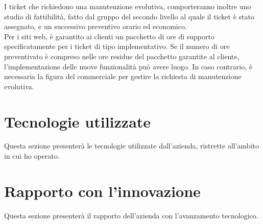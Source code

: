 		I ticket che richiedono una manutenzione evolutiva, comporteranno inoltre uno studio di fattibilità, fatto dal gruppo del secondo livello al quale il ticket è stato assegnato, e un successivo preventivo orario ed economico. \\
		Per i siti web, è garantito ai clienti un pacchetto di ore di supporto specificatamente per i ticket di tipo implementativo. Se il numero di ore preventivato è compreso nelle ore residue del pacchetto garantite al cliente, l'implementazione delle nuove funzionalità può avere luogo. In caso contrario, è necessaria la figura del commerciale per gestire la richiesta di manutenzione evolutiva.

\section{Tecnologie utilizzate}
\label{sec:tecnologie_utilizzate}
Questa sezione presenterà le tecnologie utilizzate dall'azienda, ristrette all'ambito in cui ho operato.

\section{Rapporto con l'innovazione}
\label{sec:rapporto_con_innovazione}
Questa sezione presenterà il rapporto dell'azienda con l'avanzamento tecnologico.
